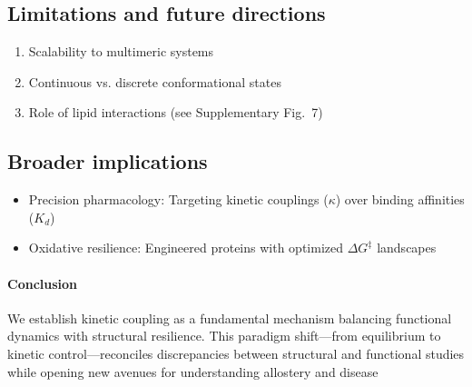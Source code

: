 \documentclass[a4paper,12pt]{article}
\begin{document}
	\subsection*{Limitations and future directions}
	\begin{enumerate}
		\item Scalability to multimeric systems
		\item Continuous vs. discrete conformational states
		\item Role of lipid interactions (see Supplementary Fig.~7)
	\end{enumerate}
	
	\subsection*{Broader implications}
	\begin{itemize}
		\item Precision pharmacology: Targeting kinetic couplings ($\kappa$) over binding affinities ($K_d$)
		\item Oxidative resilience: Engineered proteins with optimized $\Delta G^{\ddagger}$ landscapes
	\end{itemize}
	
	\paragraph*{Conclusion} We establish kinetic coupling as a fundamental mechanism balancing functional dynamics with structural resilience. This paradigm shift—from equilibrium to kinetic control—reconciles discrepancies between structural and functional studies while opening new avenues for understanding allostery and disease 
	
\end{document}
